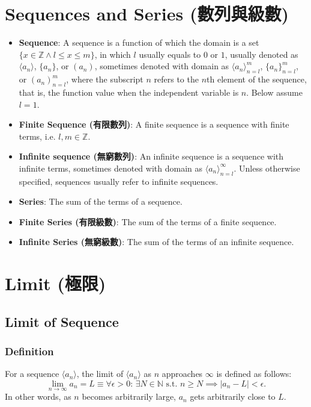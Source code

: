 \documentclass[a4paper,12pt]{report}
\begin{document}
\section{Sequences and Series (數列與級數)}
\begin{itemize}
\item\textbf{Sequence}: A sequence is a function of which the domain is a set $\{x\in\mathbb{Z}\land l\leq x\leq m\}$, in which $l$ usually equals to $0$ or $1$, usually denoted as $\langle a_n\rangle$, $\{a_n\}$, or $(a_n)$, sometimes denoted with domain as $\langle a_n\rangle_{n=l}^m$, $\{a_n\}_{n=l}^m$, or $(a_n)_{n=l}^m$, where the subscript $n$ refers to the $n$th element of the sequence, that is, the function value when the  independent variable is $n$. Below assume $l=1$.
\item\textbf{Finite Sequence (有限數列)}: A finite sequence is a sequence with finite terms, i.e. $l,m\in\mathbb{Z}$.
\item\textbf{Infinite sequence (無窮數列)}: An infinite sequence is a sequence with infinite terms, sometimes denoted with domain as $\langle a_n\rangle_{n=l}^\infty$. Unless otherwise specified, sequences usually refer to infinite sequences.
\end{itemize}
\begin{itemize}
\item\textbf{Series}: The sum of the terms of a sequence.
\item\textbf{Finite Series (有限級數)}: The sum of the terms of a finite sequence.
\item\textbf{Infinite Series (無窮級數)}: The sum of the terms of an infinite sequence.
\end{itemize}



\section{Limit (極限)}
\subsection{Limit of Sequence}
\subsubsection{Definition}
For a sequence \(\langle a_n\rangle\), the limit of \(\langle a_n\rangle\) as \( n \) approaches \( \infty \) is defined as follows:
\[\lim_{n \to \infty} a_n = L \equiv \forall \epsilon > 0:\, \exists N \in\mathbb{N}\text{\ s.t.\ } n \geq N\implies |a_n - L| < \epsilon.\]
In other words, as \(n\) becomes arbitrarily large, \(a_n\) gets arbitrarily close to \(L\).
\end{document}
